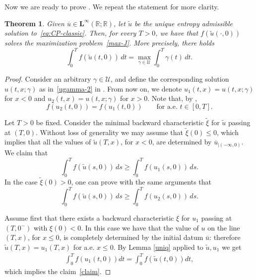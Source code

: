 \documentclass[a4paper, 10pt, final]{article}
\newtheorem{theorem}{Theorem}[section]
\newcommand{\R}{\mathbb{R}} \newcommand{\N}{\mathbb{N}}
\begin{document}
 Now we are ready to prove . We repeat the statement for more clarity.  

\begin{theorem}
  \label{teo:classical-sol} 
  Given $\overline u\in \mathbf{L^\infty}(\R; \R)$,
  let $\widetilde u$ be the unique entropy admissible solution
  to~\eqref{eq:CP-classic}. 
  Then, for every $T>0$, we have that  $f(\widetilde u(\cdot, 0))$
  solves the maximization problem~\eqref{max-J}. 
  More precisely, there holds   
  \begin{equation*}
    \int_0^T f(\widetilde u(t,0)) \, dt =
    \max_{\gamma \in {\mathcal{U}}} \int_0^T \gamma(t)\,  dt.
  \end{equation*}
\end{theorem}
 
\begin{proof}
  Consider an arbitrary $\gamma\in \mathcal{U}$, and define the corresponding solution 
  $u(t,x; \gamma)$ as in~\eqref{ugamma-2} in .  
  From now on, we denote $u_1(t,x) = u(t,x; \gamma)$ for $x<0$ and 
  $u_2(t,x) = u(t,x; \gamma)$ for $x>0$.
  Note that, by , 
  \[f(u_2(t,0)) = f(u_1(t,0))\qquad\text{for a.e. $t\in [0,T]$}.\]

  Let $T>0$ be fixed. 
  Consider the minimal backward characteristic $\widetilde \xi$ for $\widetilde u$ 
  passing at $(T,0)$. Without loss of generality we may assume  that $\widetilde \xi(0)\leq 0$,
  which implies that all the values of $\widetilde{u}(T, x)$, for $x < 0$,
  are determined by $\overline u_{|(-\infty, 0)}$. 
  We claim that
  \begin{equation}
    \label{claim}
    \int_0^{T} f\left( \widetilde u(s, 0)\right)\, ds \geq 
    \int_0^T f\left(u_1(s, 0)\right)\, ds.
  \end{equation}
  In the case $\widetilde \xi(0) > 0$, one
  can prove with the same arguments that
  \[
    \int_0^{T} f\left( \widetilde u(s, 0)\right)\, ds \geq 
    \int_0^T f\left(u_2(s, 0)\right)\, ds.
  \]

  Assume first that there exists a 
  backward characteristic $\xi$ for $u_1$ passing at $(T,0^-)$ with  $\xi(0)<0$. 
  In this case we have that the value of $u$ on the line $(T, x)$, 
  for $x\leq 0$, is completely determined by the initial datum $\overline u$: 
  therefore $\widetilde u(T,x) = u_1(T,x)$ for a.e. $x\leq 0$. By Lemma \ref{uniq} applied to $\widetilde u, u_1$ we get  
  \begin{align*}
    \int_0^{T} f(u_1(t,0))dt
    =\int_0^{T} f(\widetilde u(t,0))dt,
  \end{align*}
  which implies the claim~\eqref{claim}.  


\end{proof}
\end{document}
